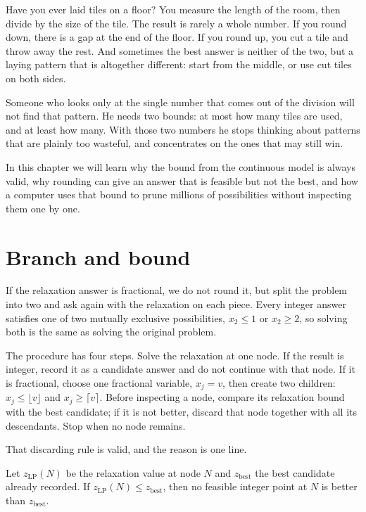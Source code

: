 \begin{untukanak}
Have you ever laid tiles on a floor? You measure the length of the room, then divide by the size
of the tile. The result is rarely a whole number. If you round down, there is a gap at the end
of the floor. If you round up, you cut a tile and throw away the rest. And sometimes the best
answer is neither of the two, but a laying pattern that is altogether different: start from the
middle, or use cut tiles on both sides.

Someone who looks only at the single number that comes out of the division will not find that
pattern. He needs two bounds: at most how many tiles are used, and at least how many. With those
two numbers he stops thinking about patterns that are plainly too wasteful, and concentrates on
the ones that may still win.

In this chapter we will learn why the bound from the continuous model is always valid, why
rounding can give an answer that is feasible but not the best, and how a computer uses that
bound to prune millions of possibilities without inspecting them one by one.
\end{untukanak}

\section{Branch and bound}

If the relaxation answer is fractional, we do not round it, but split the problem into two and
ask again with the relaxation on each piece. Every integer answer satisfies one of two mutually
exclusive possibilities, $x_{2}\le1$ or $x_{2}\ge2$, so solving both is the same as solving the
original problem.

The procedure has four steps. Solve the relaxation at one node. If the result is integer, record
it as a candidate answer and do not continue with that node. If it is fractional, choose one
fractional variable, $x_{j}=v$, then create two children: $x_{j}\le\lfloor v\rfloor$ and
$x_{j}\ge\lceil v\rceil$. Before inspecting a node, compare its relaxation bound with the best
candidate; if it is not better, discard that node together with all its descendants. Stop when
no node remains.

That discarding rule is valid, and the reason is one line.

\begin{proposisi}
Let $z_{\mathrm{LP}}(N)$ be the relaxation value at node $N$ and $z_{\mathrm{best}}$ the best
candidate already recorded. If $z_{\mathrm{LP}}(N)\le z_{\mathrm{best}}$, then no feasible
integer point at $N$ is better than $z_{\mathrm{best}}$.
\end{proposisi}

